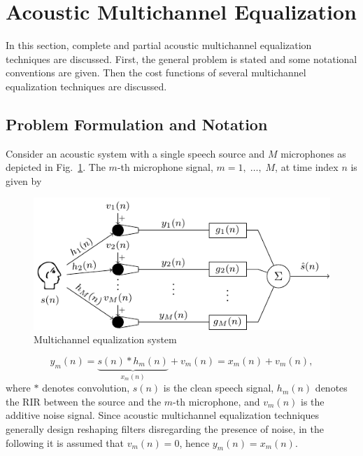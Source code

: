 \documentclass[10pt]{IEEEtran}
\begin{document}
\section{Acoustic Multichannel Equalization}
\label{sec: intro}
In this section, complete and partial acoustic multichannel equalization techniques are discussed.
First, the general problem is stated and some notational conventions are given.
Then the cost functions of several multichannel equalization techniques are discussed.

\subsection{Problem Formulation and Notation}
\label{subsec: prob}
Consider an acoustic system with a single speech source and $M$ microphones as depicted in Fig.~\ref{fig: acsys}.
The $m$-th microphone signal, $m = 1, \; \ldots, \; M$, at time index $n$ is given by
\begin{figure}[b]
  \centering
  \includegraphics[scale=0.9]{figures/configuration.pdf}
  \caption{Multichannel equalization system}
  \label{fig: acsys}
\end{figure}
\begin{equation}
  y_m(n) =  \underbrace{s(n) \ast h_m(n)}_{x_m(n)} + v_m(n) = x_m(n) + v_m(n),
\end{equation}
where $\ast$ denotes convolution, $s(n)$ is the clean speech signal, $h_m(n)$ denotes the RIR between the source and the $m$-th microphone, and $v_m(n)$ is the additive noise signal.
Since acoustic multichannel equalization techniques generally design reshaping filters disregarding the presence of noise, in the following it is assumed that $v_m(n) = 0$, hence $y_m(n) = x_m(n)$.
\end{document}
